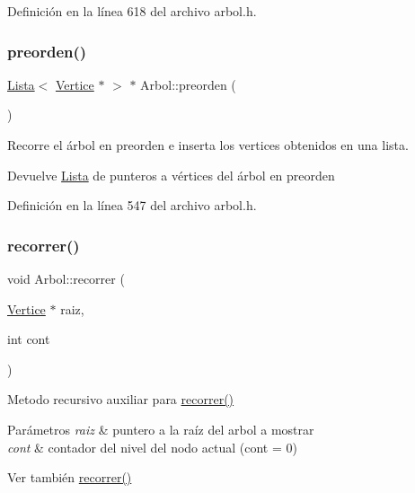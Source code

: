 Definición en la línea 618 del archivo arbol.\+h.

\mbox{\label{classArbol_a0ffdc60ce8f2267366681cc94cf6beea}} 
\subsubsection{\texorpdfstring{preorden()}{preorden()}}
{\footnotesize\ttfamily \hyperlink{classLista}{Lista}$<$ \hyperlink{classVertice}{Vertice} $\ast$ $>$ $\ast$ Arbol\+::preorden (\begin{DoxyParamCaption}{ }\end{DoxyParamCaption})}



Recorre el árbol en preorden e inserta los vertices obtenidos en una lista. 

\begin{DoxyReturn}{Devuelve}
\hyperlink{classLista}{Lista} de punteros a vértices del árbol en preorden 
\end{DoxyReturn}


Definición en la línea 547 del archivo arbol.\+h.

\mbox{\label{classArbol_a0ae46c572d300cd4a5f27b7d00a1a14e}} 
\subsubsection{\texorpdfstring{recorrer()}{recorrer()}}
{\footnotesize\ttfamily void Arbol\+::recorrer (\begin{DoxyParamCaption}\item[{\hyperlink{classVertice}{Vertice} $\ast$}]{raiz,  }\item[{int}]{cont }\end{DoxyParamCaption})}



Metodo recursivo auxiliar para \hyperlink{classArbol_a5bd356760f63521e8578a83613aa4792}{recorrer()} 


\begin{DoxyParams}{Parámetros}
{\em raiz} & puntero a la raíz del arbol a mostrar \\
\hline
{\em cont} & contador del nivel del nodo actual (cont = 0) \\
\hline
\end{DoxyParams}
\begin{DoxySeeAlso}{Ver también}
\hyperlink{classArbol_a5bd356760f63521e8578a83613aa4792}{recorrer()} 
\end{DoxySeeAlso}


